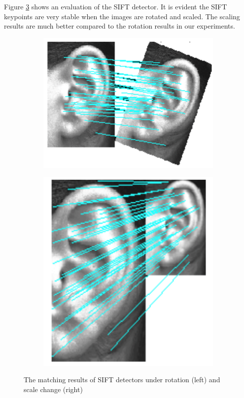 Figure \ref{fig:test4} shows an evaluation of the SIFT detector. It is evident the SIFT keypoints are very stable when the images are rotated and scaled. The scaling results are much better compared to the rotation results in our experiments.
\begin{figure}
\centering
\begin{subfigure}{.5\textwidth}
  \centering
  \includegraphics[width=.5\linewidth]{Figures/Figure11}
  \label{fig:sub11}
\end{subfigure}%
\begin{subfigure}{.5\textwidth}
  \centering
  \includegraphics[width=.5\linewidth]{Figures/Figure12}
  \label{fig:sub12}
\end{subfigure}
\caption{The matching results of SIFT detectors under rotation (left) and scale change (right)}
\label{fig:test4}
\end{figure}
